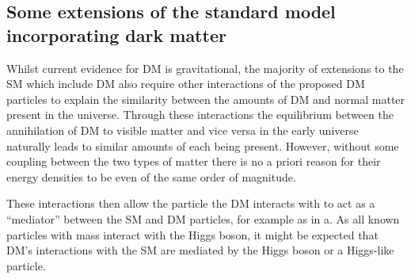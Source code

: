 \subsection{Some extensions of the standard model incorporating dark matter}
\label{sec:DMextensions}
Whilst current evidence for \ac{DM} is gravitational, the majority of extensions to the \ac{SM} which include \ac{DM} also require other interactions of the proposed \ac{DM} particles to explain the similarity between the amounts of \ac{DM} and normal matter present in the universe. Through these interactions the equilibrium between the annihilation of \ac{DM} to visible matter and vice versa in the early universe naturally leads to similar amounts of each being present. However, without some coupling between the two types of matter there is no a priori reason for their energy densities to be even of the same order of magnitude. 

 These interactions then allow the particle the \ac{DM} interacts with to act as a ``mediator'' between the \ac{SM} and \ac{DM} particles, for example as in a. As all known particles with mass interact with the Higgs boson, it might be expected that \ac{DM}'s interactions with the \ac{SM} are mediated by the Higgs boson or a Higgs-like particle.

